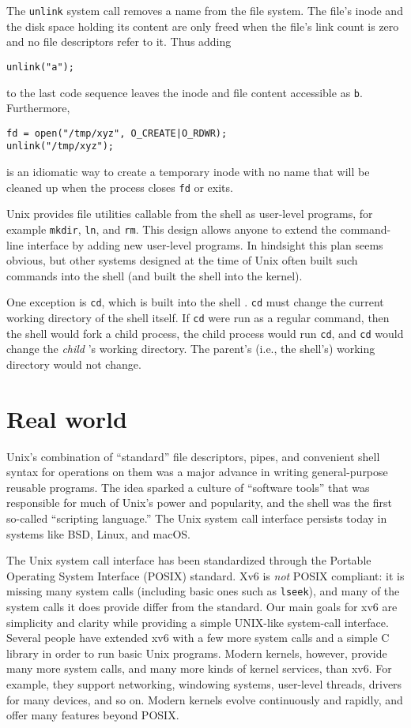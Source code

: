 The
\lstinline{unlink}
system call removes a name from the file system.
The file's inode and the disk space holding its content
are only freed when the file's link count is zero and
no file descriptors refer to it.
Thus adding
\begin{lstlisting}[]
unlink("a");
\end{lstlisting}
to the last code sequence leaves the inode
and file content accessible as
\lstinline{b}.
Furthermore,
\begin{lstlisting}[]
fd = open("/tmp/xyz", O_CREATE|O_RDWR);
unlink("/tmp/xyz");
\end{lstlisting}
is an idiomatic way to create a temporary inode
with no name
that will be cleaned up when the process closes
\lstinline{fd}
or exits.

Unix provides
file utilities callable from the shell
as user-level programs, for example
\lstinline{mkdir},
\lstinline{ln},
and
\lstinline{rm}.
This design allows anyone to extend the command-line interface
by adding new user-level programs.  In hindsight this plan seems obvious,
but other systems designed at the time of Unix often built such commands into
the shell (and built the shell into the kernel).

One exception is
\lstinline{cd},
which is built into the shell
.
\lstinline{cd}
must change the current working directory of the
shell itself.  If
\lstinline{cd}
were run as a regular command, then the shell would fork a child
process, the child process would run
\lstinline{cd},
and
\lstinline{cd}
would change the
\textit{child} 's
working directory.  The parent's (i.e.,
the shell's) working directory would not change.
\section{Real world}

Unix's combination of ``standard'' file
descriptors, pipes, and convenient shell syntax for
operations on them was a major advance in writing
general-purpose reusable programs.
The idea sparked a culture of ``software tools'' that was
responsible for much of Unix's power and popularity,
and the shell was the first so-called ``scripting language.''
The Unix system call interface persists today in systems like
BSD, Linux, and macOS.

The Unix system call interface has been standardized through the Portable
Operating System Interface (POSIX) standard.
Xv6 is
\textit{not}
POSIX compliant:  it is missing many system calls (including basic ones such as
\lstinline{lseek}),
and many of the system calls it does provide differ from the standard.
Our main goals for xv6 are
simplicity and clarity while providing a simple UNIX-like system-call interface.
Several people have extended xv6 with a few more system calls and a simple
C library in order to run basic Unix programs.  Modern kernels, however,
provide many more system calls, and many more kinds of kernel services, than
xv6.  For example, they support networking, windowing systems, user-level threads,
drivers for many devices, and so on.  Modern kernels evolve continuously and
rapidly, and offer many features beyond POSIX.


